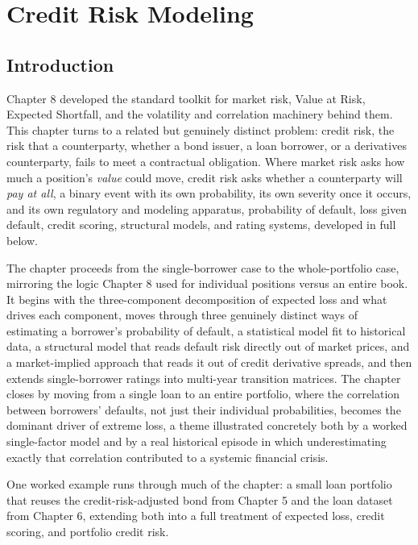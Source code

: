 \documentclass[../ai_in_finance]{subfiles}
\begin{document}
\chapter{Credit Risk Modeling}

\section{Introduction}

Chapter 8 developed the standard toolkit for market risk, Value at Risk, Expected Shortfall, and the volatility and correlation machinery behind them. This chapter turns to a related but genuinely distinct problem: credit risk, the risk that a counterparty, whether a bond issuer, a loan borrower, or a derivatives counterparty, fails to meet a contractual obligation. Where market risk asks how much a position's \emph{value} could move, credit risk asks whether a counterparty will \emph{pay at all}, a binary event with its own probability, its own severity once it occurs, and its own regulatory and modeling apparatus, probability of default, loss given default, credit scoring, structural models, and rating systems, developed in full below.

The chapter proceeds from the single-borrower case to the whole-portfolio case, mirroring the logic Chapter 8 used for individual positions versus an entire book. It begins with the three-component decomposition of expected loss and what drives each component, moves through three genuinely distinct ways of estimating a borrower's probability of default, a statistical model fit to historical data, a structural model that reads default risk directly out of market prices, and a market-implied approach that reads it out of credit derivative spreads, and then extends single-borrower ratings into multi-year transition matrices. The chapter closes by moving from a single loan to an entire portfolio, where the correlation between borrowers' defaults, not just their individual probabilities, becomes the dominant driver of extreme loss, a theme illustrated concretely both by a worked single-factor model and by a real historical episode in which underestimating exactly that correlation contributed to a systemic financial crisis.

One worked example runs through much of the chapter: a small loan portfolio that reuses the credit-risk-adjusted bond from Chapter 5 and the loan dataset from Chapter 6, extending both into a full treatment of expected loss, credit scoring, and portfolio credit risk.
\end{document}
